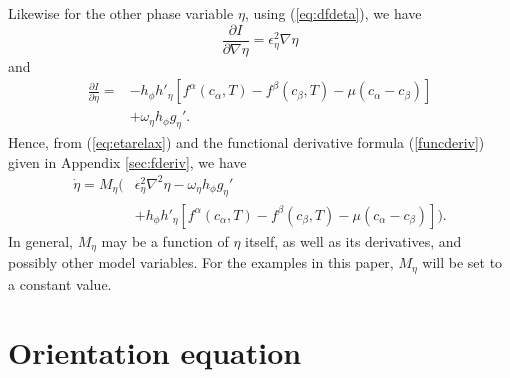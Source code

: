 Likewise for the other phase variable $\eta$, using (\ref{eq:dfdeta}),
we have
%
\begin{equation}
  \frac{\partial I}{\partial \nabla \eta} = \epsilon_{\eta}^2 \nabla \eta
\end{equation}
%
and
%
\begin{equation}
\begin{split}
  \frac{\partial I}{\partial \eta} = {}
  & - h_\phi h'_\eta \left[
    f^\alpha(c_\alpha,T) - f^\beta(c_\beta,T)
    - \mu ( c_\alpha - c_\beta ) \right]
  \\ & + \omega_\eta h_\phi g_\eta'.
\end{split}
\end{equation}
%
Hence, from (\ref{eq:etarelax}) and the functional derivative formula
(\ref{funcderiv}) given in Appendix \ref{sec:fderiv}, we have
%
\begin{equation}
\begin{split}
  \dot{\eta} =
  M_\eta \Big(
  & \epsilon_{\eta}^2 \nabla^2 \eta
    - \omega_\eta h_\phi g_\eta'
  \\ &
    + h_\phi h'_\eta \left[
    f^\alpha(c_\alpha,T) - f^\beta(c_\beta,T)
    - \mu ( c_\alpha - c_\beta ) \right]
  \Big).
\label{eq:etaeom}
\end{split}
\end{equation}
%
In general, $M_\eta$ may be a function of $\eta$ itself, as well as
its derivatives, and possibly other model variables.  For the examples
in this paper, $M_\eta$ will be set to a constant value.

%
\section{Orientation equation}
\label{sec:orientationmodel}

